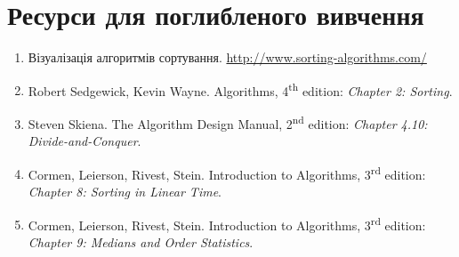 \documentclass[12pt,a4paper]{report}
\begin{document}
\section*{Ресурси для поглибленого вивчення}
\begin{enumerate}
    \item Візуалізація алгоритмів сортування. \href{http://www.sorting-algorithms.com/}{http://www.sorting-algorithms.com/}
    \item Robert Sedgewick, Kevin Wayne. Algorithms, 4\textsuperscript{th} edition: {\itshape Chapter 2: Sorting}.
    \item Steven Skiena. The Algorithm Design Manual, 2\textsuperscript{nd} edition: {\itshape Chapter 4.10: Divide-and-Conquer}.
    \item Cormen, Leierson, Rivest, Stein. Introduction to Algorithms, 3\textsuperscript{rd} edition: {\itshape Chapter 8: Sorting in Linear Time}.
    \item Cormen, Leierson, Rivest, Stein. Introduction to Algorithms, 3\textsuperscript{rd} edition: {\itshape Chapter 9: Medians and Order Statistics}.
\end{enumerate}
\end{document}
